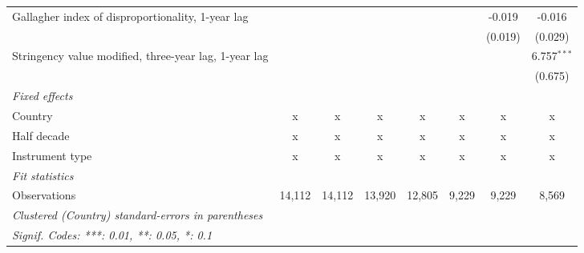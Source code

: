 \begin{table}[htbp]
\begin{tabular}{lccccccc}
      Gallagher index of disproportionality, 1-year lag     &             &             &         &         &               & -0.019        & -0.016\\   
                                                            &             &             &         &         &               & (0.019)       & (0.029)\\   
      Stringency value modified, three-year lag, 1-year lag &             &             &         &         &               &               & 6.757$^{***}$\\   
                                                            &             &             &         &         &               &               & (0.675)\\   
      \emph{Fixed effects}\\
      Country                                               & x           & x           & x       & x       & x             & x             & x\\  
      Half decade                                           & x           & x           & x       & x       & x             & x             & x\\  
      Instrument type                                       & x           & x           & x       & x       & x             & x             & x\\  
      \midrule \emph{Fit statistics}\\
      Observations                                          & 14,112      & 14,112      & 13,920  & 12,805  & 9,229         & 9,229         & 8,569\\  
      \midrule
      \multicolumn{8}{l}{\emph{Clustered (Country) standard-errors in parentheses}}\\
      \multicolumn{8}{l}{\emph{Signif. Codes: ***: 0.01, **: 0.05, *: 0.1}}\\
   \end{tabular}
\end{table}


